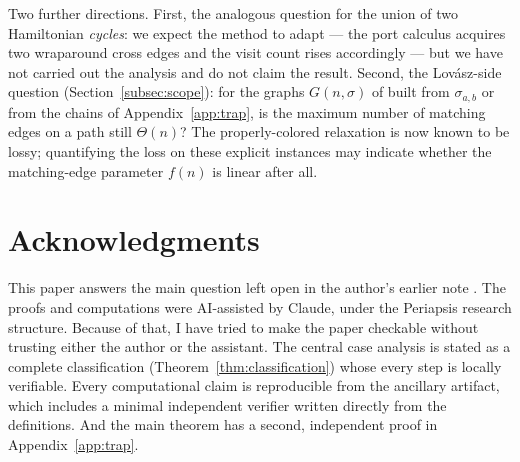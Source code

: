\documentclass[11pt]{article}
\theoremstyle{definition}
\begin{document}
Two further directions. First, the analogous question for the union of two
Hamiltonian \emph{cycles}: we expect the method to adapt --- the port calculus
acquires two wraparound cross edges and the visit count rises accordingly --- but
we have not carried out the analysis and do not claim the result. Second, the
Lov\'asz-side question (Section~\ref{subsec:scope}): for the graphs $G(n, \sigma)$
of \cite{Liz26} built from $\sigma_{a,b}$ or from the chains of
Appendix~\ref{app:trap}, is the maximum number of matching edges on a path still
$\Theta(n)$? The properly-colored relaxation is now known to be lossy; quantifying
the loss on these explicit instances may indicate whether the matching-edge
parameter $f(n)$ is linear after all.

\section*{Acknowledgments}

This paper answers the main question left open in the author's earlier note
\cite{Liz26}. The proofs and computations were AI-assisted by Claude, under the
Periapsis research structure. Because of that, I have tried to make the paper
checkable without trusting either the author or the assistant. The central case
analysis is stated as a complete classification (Theorem~\ref{thm:classification})
whose every step is locally verifiable. Every computational claim is reproducible
from the ancillary artifact, which includes a minimal independent verifier written
directly from the definitions. And the main theorem has a second, independent proof
in Appendix~\ref{app:trap}.
\end{document}
